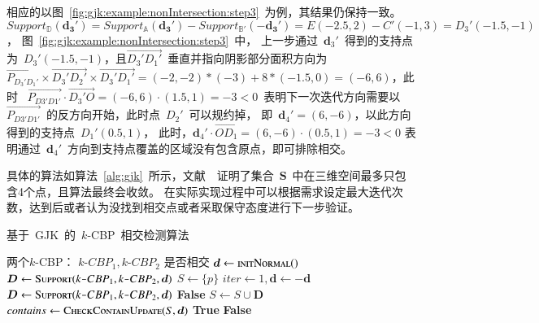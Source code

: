 相应的以图~\ref{fig:gjk:example:nonIntersection:step3}~为例，其结果仍保持一致。
$ Support_\mathbb{D}(\bm{d_3'})  = Support_\mathbb{A}(\bm{d_3'}) - Support_\mathbb{B'}(-\bm{d_3'}) = E(-2.5, 2) - C'(-1, 3) = D_3'(-1.5, -1)$，
图~\ref{fig:gjk:example:nonIntersection:step3}~中，
上一步通过~$\bm{d}_3'$~得到的支持点为~$D_3'(-1.5, -1)$，且$\overrightarrow{D_3'D_1'}$~垂直并指向阴影部分面积方向为~$\overrightarrow{P_{D_3'D_1'}}
\times \overrightarrow{D_3'D_2'} \times \overrightarrow{D_3'D_1'} =
(-2,-2)*(-3) + 8*(-1.5, 0) = (-6, 6)$，此时
~$\overrightarrow{P_{D3'D1'}} \cdot \overrightarrow{D_3'O} = (-6, 6) \cdot (1.5, 1) = -3 < 0$~表明下一次迭代方向需要以~$\overrightarrow{P_{D3'D1'}}$~的反方向开始，此时点~$D_2'$~可以规约掉，
即~$\bm{d}_4'= (6, -6)$，以此方向得到的支持点~$D_1'(0.5, 1)$，
此时，$\bm{d}_4' \cdot \overrightarrow{OD_1} = (6, -6) \cdot (0.5, 1) = -3 < 0 $ 表明通过~$\bm{d}_4'$~方向到支持点覆盖的区域没有包含原点，即可排除相交。

具体的算法如算法~\ref{alg:gjk}~所示，文献~~证明了集合~$\bm{S}$~中在三维空间最多只包含4个点，且算法最终会收敛。
在实际实现过程中可以根据需求设定最大迭代次数，达到后或者认为没找到相交点或者采取保守态度进行下一步验证。

\begin{algorithm}[htbp]
\small
\caption{基于~GJK~的~$k$-CBP~相交检测算法}
\label{alg:gjk}
\begin{algorithmic}[1]
\Require
两个$k$-CBP： $k\texttt{-}CBP_1, k\texttt{-}CBP_2$
\Ensure
是否相交
    \State $\bm{d} \gets \Call{initNormal}$
    \State $\bm{D} \gets \Call{Support}{k\texttt{-}CBP_1, k\texttt{-}CBP_2, \bm{d}}$
    \State $S \gets \{p\}$
    \State $iter \gets 1 , \bm{d} \gets -\bm{d}$
        \State $\bm{D} \gets \Call{Support}{k\texttt{-}CBP_1, k\texttt{-}CBP_2, \bm{d}}$
            \State \Return \textbf{False}
        \EndIf
        \State $S \gets S \cup \bm{D}$
        \State $ contains \gets \Call{CheckContainUpdate}{S, \bm{d}}$ 
            \State \Return \textbf{True} 
        \EndIf
    \EndWhile
    \State \Return \textbf{False} 
\EndFunction
\end{algorithmic}
\end{algorithm}

